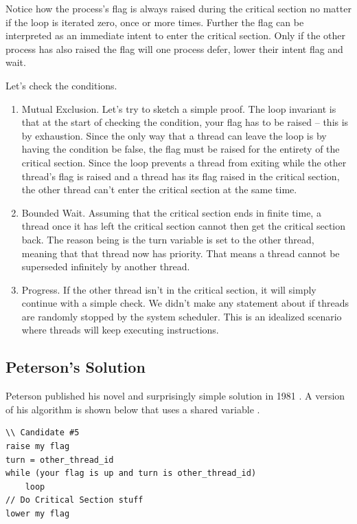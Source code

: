 Notice how the process's flag is always raised during the critical section no matter if the loop is iterated zero, once or more times.
Further the flag can be interpreted as an immediate intent to enter the critical section.
Only if the other process has also raised the flag will one process defer, lower their intent flag and wait.

Let's check the conditions.

\begin{enumerate}
\item Mutual Exclusion. Let's try to sketch a simple proof.
  The loop invariant is that at the start of checking the condition, your flag has to be raised -- this is by exhaustion.
  Since the only way that a thread can leave the loop is by having the condition be false, the flag must be raised for the entirety of the critical section.
  Since the loop prevents a thread from exiting while the other thread's flag is raised and a thread has its flag raised in the critical section, the other thread can't enter the critical section at the same time.
\item Bounded Wait.
  Assuming that the critical section ends in finite time, a thread once it has left the critical section cannot then get the critical section back.
  The reason being is the turn variable is set to the other thread, meaning that that thread now has priority.
  That means a thread cannot be superseded infinitely by another thread.
\item Progress.  If the other thread isn't in the critical section, it will simply continue with a simple check. We didn't make any statement about if threads are randomly stopped by the system scheduler.
  This is an idealized scenario where threads will keep executing instructions.
\end{enumerate}

\subsection{Peterson's Solution}

Peterson published his novel and surprisingly simple solution in 1981 \cite{Peterson1981MythsAT}.
A version of his algorithm is shown below that uses a shared variable .

\begin{lstlisting}
\\ Candidate #5
raise my flag
turn = other_thread_id
while (your flag is up and turn is other_thread_id)
    loop
// Do Critical Section stuff
lower my flag
\end{lstlisting}

